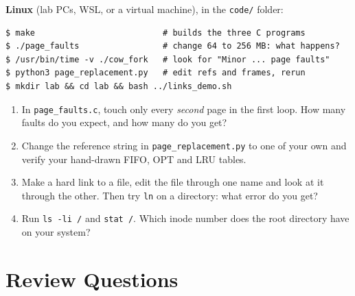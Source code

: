 \documentclass[11pt,a4paper]{article}
\newcommand{\cmd}[1]{\texttt{#1}}
\begin{document}
\begin{tryit}
\textbf{Linux} (lab PCs, WSL, or a virtual machine), in the \texttt{code/} folder:
\begin{lstlisting}[style=term]
$ make                          # builds the three C programs
$ ./page_faults                 # change 64 to 256 MB: what happens?
$ /usr/bin/time -v ./cow_fork   # look for "Minor ... page faults"
$ python3 page_replacement.py   # edit refs and frames, rerun
$ mkdir lab && cd lab && bash ../links_demo.sh
\end{lstlisting}
\begin{enumerate}[leftmargin=1.4em]
  \item In \cmd{page\_faults.c}, touch only every \emph{second} page in the first loop. How many faults do you expect, and how many do you get?
  \item Change the reference string in \cmd{page\_replacement.py} to one of your own and verify your hand-drawn FIFO, OPT and LRU tables.
  \item Make a hard link to a file, edit the file through one name and look at it through the other. Then try \cmd{ln} on a directory: what error do you get?
  \item Run \cmd{ls -li /} and \cmd{stat /}. Which inode number does the root directory have on your system?
\end{enumerate}
\end{tryit}

\section{Review Questions}
\end{document}
